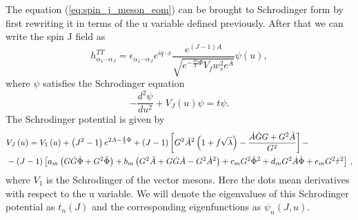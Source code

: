 \documentclass[a4paper,12pt]{article}
\begin{document}

The equation (\ref{eq:spin_j_meson_eom}) can be brought to Schrodinger form by first rewriting it in terms of the u variable defined previously. After that we can write the spin J field as
\begin{equation}
h^{TT}_{\alpha_1 \cdots \alpha_J} = \epsilon_{\alpha_1 \cdots \alpha_J} e^{i q \cdot x} \frac{e^{\left(J-1\right)A}}{\sqrt{e^{-\frac{10}{3}\Phi}V_f w_s^2 e^A}} \psi\left(u\right),
\end{equation}
where $\psi$ satisfies the Schrodinger equation
\begin{equation}
- \frac{d^2 \psi}{du^2} + V_J \left(u\right) \psi = t \psi.
\label{eq:schrodinger_problem_meson}
\end{equation}
The Schrodinger potential is given by
\begin{align}
&V_J\left(u\right) = V_1\left(u\right) + \left(J^2 - 1\right) e^{2 A - \frac{4}{3} \Phi} + \left(J-1\right) \left[G^2 \dot{A}^2 \left( 1+ f \sqrt{\lambda}  \right) - \frac{\dot{A}\dot{G}G+G^2 \ddot{A}}{G^2} \right] - \label{eq:meson_schrodinger_potential} \\
& - \left(J-1\right) \left[a_m \left( G \dot{G} \dot{\Phi} + G^2 \ddot{\Phi} \right) + b_m \left( G^2 \ddot{A} + G \dot{G} \dot{A} -G^2 \dot{A}^2\right) + c_m G^2 \dot{\Phi}^2 + d_m G^2 \dot{A}\dot{\Phi} + e_m G^2 \dot{\tau}^2 \right] \, , \notag
\end{align}
where $V_1$ is the Schrodinger of the vector mesons. Here the dots mean derivatives with respect to the u variable.
We will denote the eigenvalues of this Schrodinger potential as $t_n\left(J\right)$ and the corresponding eigenfunctions as $\psi_n\left(J, u\right)$.
\end{document}
